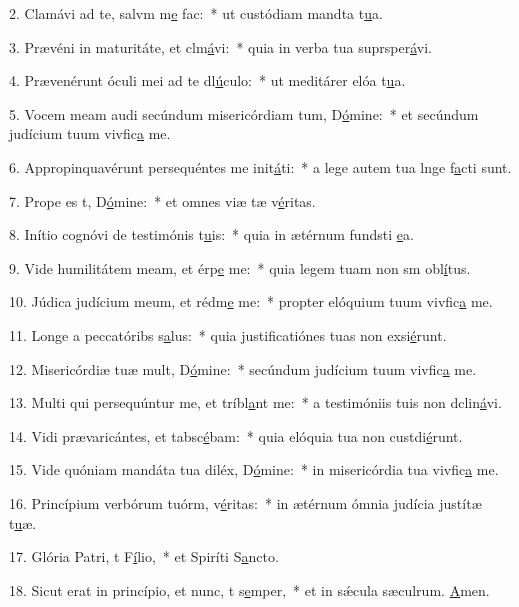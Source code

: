 2. Clamávi ad te, salvm m\uline{e} fac:~* ut custódiam mandta t\uline{u}a.\par 
3. Prævéni in maturitáte, et clm\uline{á}vi:~* quia in verba tua suprsper\uline{á}vi.\par 
4. Prævenérunt óculi mei ad te dl\uline{ú}culo:~* ut meditárer elóa t\uline{u}a.\par 
5. Vocem meam audi secúndum misericórdiam tum, D\uline{ó}mine:~* et secúndum judícium tuum vivfic\uline{a} me.\par 
6. Appropinquavérunt persequéntes me init\uline{á}ti:~* a lege autem tua lnge f\uline{a}cti sunt.\par 
7. Prope es t, D\uline{ó}mine:~* et omnes viæ tæ v\uline{é}ritas.\par 
8. Inítio cognóvi de testimónis t\uline{u}is:~* quia in ætérnum fundsti \uline{e}a.\par 
9. Vide humilitátem meam, et érp\uline{e} me:~* quia legem tuam non sm obl\uline{í}tus.\par 
10. Júdica judícium meum, et rédm\uline{e} me:~* propter elóquium tuum vivfic\uline{a} me.\par 
11. Longe a peccatóribs s\uline{a}lus:~* quia justificatiónes tuas non exsi\uline{é}runt.\par 
12. Misericórdiæ tuæ mult, D\uline{ó}mine:~* secúndum judícium tuum vivfic\uline{a} me.\par 
13. Multi qui persequúntur me, et tríbl\uline{a}nt me:~* a testimóniis tuis non dclin\uline{á}vi.\par 
14. Vidi prævaricántes, et tabsc\uline{é}bam:~* quia elóquia tua non custdi\uline{é}runt.\par 
15. Vide quóniam mandáta tua diléx, D\uline{ó}mine:~* in misericórdia tua vivfic\uline{a} me.\par 
16. Princípium verbórum tuórm, v\uline{é}ritas:~* in ætérnum ómnia judícia justítæ t\uline{u}æ.\par 
17. Glória Patri, t F\uline{í}lio,~* et Spiríti S\uline{a}ncto.\par 
18. Sicut erat in princípio, et nunc, t s\uline{e}mper,~* et in sǽcula sæculrum. \uline{A}men.\par 
